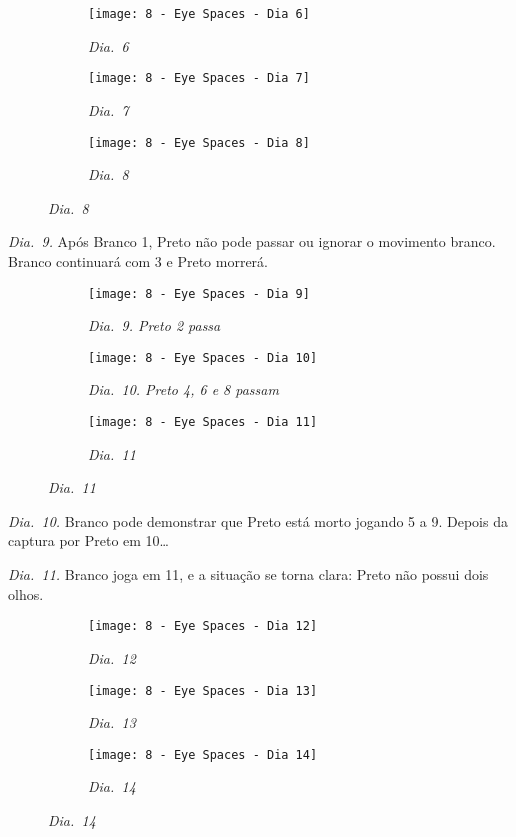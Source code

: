 \begin{figure}[h!]
    \centering
    \begin{subfigure}[t]{.31\textwidth}
        \texttt{[image: 8 - Eye Spaces - Dia 6]}
        \caption*{\emph{Dia.\@~6}}
    \end{subfigure}
    \hfill
    \begin{subfigure}[t]{.31\textwidth}
        \texttt{[image: 8 - Eye Spaces - Dia 7]}
        \caption*{\emph{Dia.\@~7}}
    \end{subfigure}
    \hfill
    \begin{subfigure}[t]{.31\textwidth}
        \texttt{[image: 8 - Eye Spaces - Dia 8]}
        \caption*{\emph{Dia.\@~8}}
    \end{subfigure}
\end{figure}

\pagebreak

\emph{Dia.\@~9.} Após Branco 1, Preto não pode passar ou ignorar o movimento branco. Branco continuará com 3 e Preto morrerá.

\begin{figure}[h!]
    \centering
    \begin{subfigure}[t]{.31\textwidth}
        \texttt{[image: 8 - Eye Spaces - Dia 9]}
        \caption*{\emph{Dia.\@~9. Preto 2 passa}}
    \end{subfigure}
    \hfill
    \begin{subfigure}[t]{.31\textwidth}
        \texttt{[image: 8 - Eye Spaces - Dia 10]}
        \caption*{\emph{Dia.\@~10. Preto 4, 6 e 8 passam}}
    \end{subfigure}
    \hfill
    \begin{subfigure}[t]{.31\textwidth}
        \texttt{[image: 8 - Eye Spaces - Dia 11]}
        \caption*{\emph{Dia.\@~11}}
    \end{subfigure}
\end{figure}

\emph{Dia.\@~10.} Branco pode demonstrar que Preto está morto jogando 5 a 9. Depois da captura por Preto em 10\ldots

\emph{Dia.\@~11.} Branco joga em 11, e a situação se torna clara: Preto não possui dois olhos.

\begin{figure}[h!]
    \centering
    \begin{subfigure}[t]{.31\textwidth}
        \texttt{[image: 8 - Eye Spaces - Dia 12]}
        \caption*{\emph{Dia.\@~12}}
    \end{subfigure}
    \hfill
    \begin{subfigure}[t]{.31\textwidth}
        \texttt{[image: 8 - Eye Spaces - Dia 13]}
        \caption*{\emph{Dia.\@~13}}
    \end{subfigure}
    \hfill
    \begin{subfigure}[t]{.31\textwidth}
        \texttt{[image: 8 - Eye Spaces - Dia 14]}
        \caption*{\emph{Dia.\@~14}}
    \end{subfigure}
\end{figure}

